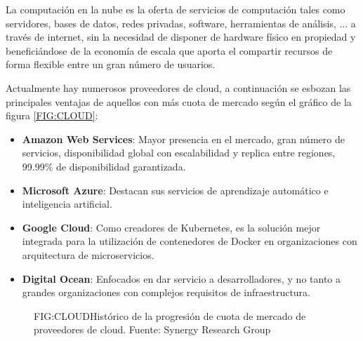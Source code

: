 
La computación en la nube\cite{ArchitectingCloud} es la oferta de servicios de computación tales como servidores, bases de datos, redes privadas, software, herramientas de análisis, ... a través de internet, sin la necesidad de disponer de hardware físico en propiedad y beneficiándose de la economía de escala que aporta el compartir recursos de forma flexible entre un gran número de usuarios.

Actualmente hay numerosos proveedores de cloud, a continuación se esbozan las principales ventajas de aquellos con más cuota de mercado según el gráfico de la figura \ref{FIG:CLOUD}:

\begin{itemize}
    \item \textbf{Amazon Web Services}: Mayor presencia en el mercado, gran número de servicios, disponibilidad global con escalabilidad y replica entre regiones, 99.99\% de disponibilidad garantizada\cite{AWS}.
    \item \textbf{Microsoft Azure}: Destacan sus servicios de aprendizaje automático e inteligencia artificial\cite{Azure}.
    \item \textbf{Google Cloud}: Como creadores de Kubernetes, es la solución mejor integrada para la utilización de contenedores de Docker en organizaciones con arquitectura de microservicios\cite{GoogleCloud}.
    \item \textbf{Digital Ocean}: Enfocados en dar servicio a desarrolladores, y no tanto a grandes organizaciones con complejos requisitos de infraestructura\cite{DigitalOcean}.
\end{itemize}

\begin{figure}[Cuota de mercado de proveedores de cloud]{FIG:CLOUD}{Histórico de la progresión de cuota de mercado de proveedores de cloud. Fuente: Synergy Research Group}
\end{figure}

\newpage
